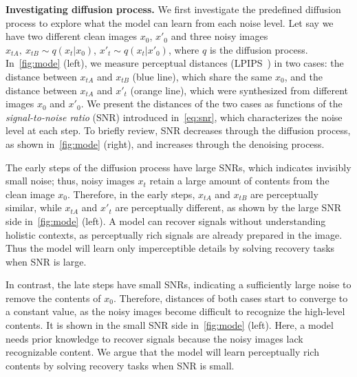 \textbf{Investigating diffusion process.  }
We first investigate the predefined diffusion process to explore what the model can learn from each noise level. 
Let say we have two different clean images $x_0$, $x'_0$ and three noisy images $x_{tA},~x_{tB}\sim q(x_t|x_0)$, $x'_t\sim q(x_t|x'_0)$, where $q$ is the diffusion process. In~\cref{fig:mode} (left), we measure perceptual distances (LPIPS~\cite{zhang2018unreasonable}) in two cases: the distance between $x_{tA}$ and $x_{tB}$ (blue line), which share the same $x_0$, and the distance between $x_{tA}$ and $x'_t$ (orange line), which were synthesized from different images $x_0$ and $x'_0$. We present the distances of the two cases as functions of the \textit{signal-to-noise ratio} (SNR) introduced in~\cref{eq:snr}, which characterizes the noise level at each step. To briefly review, SNR decreases through the diffusion process, as shown in~\cref{fig:mode} (right), and increases through the denoising process.



The early steps of the diffusion process have large SNRs, which indicates invisibly small noise; thus, noisy images $x_t$ retain a large amount of contents from the clean image $x_0$. Therefore, in the early steps, $x_{tA}$ and $x_{tB}$ are perceptually similar, while $x_{tA}$ and $x'_t$ are perceptually different, as shown by the large SNR side in~\cref{fig:mode} (left). A model can recover signals without understanding holistic contexts, as perceptually rich signals are already prepared in the image. Thus the model will learn only imperceptible details by solving recovery tasks when SNR is large. 

In contrast, the late steps have small SNRs, indicating a sufficiently large noise to remove the contents of $x_0$. Therefore, distances of both cases start to converge to a constant value, as the noisy images become difficult to recognize the high-level contents. It is shown in the small SNR side in~\cref{fig:mode} (left). Here, a model needs prior knowledge to recover signals because the noisy images lack recognizable content. We argue that the model will learn perceptually rich contents by solving recovery tasks when SNR is small.

